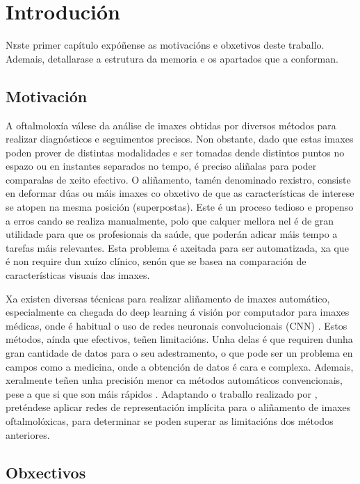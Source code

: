 \chapter{Introdución}
\label{chap:introducion}

\lettrine{N} este primer capítulo expóñense as motivacións e obxetivos deste traballo. Ademais, detallarase a estrutura da memoria e os apartados que a conforman.

\section{Motivación}
\label{sec:motivacion}

A oftalmoloxía válese da análise de imaxes obtidas por diversos métodos para realizar diagnósticos e seguimentos precisos.
Non obstante, dado que estas imaxes poden prover de distintas modalidades e ser tomadas dende distintos puntos no espazo ou en instantes separados no tempo, é preciso aliñalas para poder comparalas de xeito efectivo.
O aliñamento, tamén denominado rexistro, consiste en deformar dúas ou máis imaxes co obxetivo de que as características de interese se atopen na mesma posición (superpostas).
Este é un proceso tedioso e propenso a erros cando se realiza manualmente, polo que calquer mellora nel é de gran utilidade para que os profesionais da saúde, que poderán adicar máis tempo a tarefas máis relevantes.
Esta problema é axeitada para ser automatizada, xa que é non require dun xuízo clínico, senón que se basea na comparación de características visuais das imaxes.

Xa existen diversas técnicas para realizar aliñamento de imaxes automático, especialmente ca chegada do deep learning á visión por computador para imaxes médicas, onde é habitual o uso de redes neuronais convolucionais (\gls{CNN}) \cite{medicalimageanalysis}.
Estos métodos, aínda que efectivos, teñen limitacións. Unha delas é que requiren dunha gran cantidade de datos para o seu adestramento, o que pode ser un problema en campos como a medicina, onde a obtención de datos é cara e complexa. Ademais, xeralmente teñen unha precisión menor ca métodos automáticos convencionais, pese a que si que son máis rápidos \cite{bharati2022deeplearningmedicalimage}.
Adaptando o traballo realizado por \cite{wolterink2021implicit}, preténdese aplicar redes de representación implícita para o aliñamento de imaxes oftalmolóxicas, para determinar se poden superar as limitacións dos métodos anteriores.

\section{Obxectivos}

